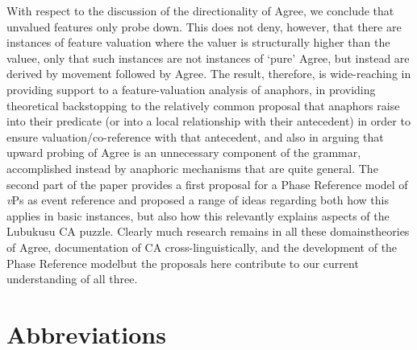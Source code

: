 \documentclass[output=paper
,modfonts
,nonflat
]{langsci/langscibook}
\begin{document}
With respect to the discussion of the directionality of Agree, we conclude that unvalued features only probe down.  This does not deny, however, that there are instances of feature valuation where the valuer is structurally higher than the valuee, only that such instances are not instances of `pure' Agree, but instead are derived by movement followed by Agree. The result, therefore, is wide-reaching in providing support to a feature-valuation analysis of anaphors, in providing theoretical backstopping to the relatively common proposal that anaphors raise into their predicate (or into a local relationship with their antecedent) in order to ensure valuation/co-reference with that antecedent, and also in arguing that upward probing of Agree is an unnecessary component of the grammar, accomplished instead by anaphoric mechanisms that are quite general. The second part of the paper provides a first proposal for a Phase Reference model of \textit{v}Ps as event reference and proposed a range of ideas regarding both how this applies in basic instances, but also how this relevantly explains aspects of the Lubukusu CA puzzle. Clearly much research remains in all these domains\textemdash theories of Agree, documentation of CA cross-linguistically, and the development of the Phase Reference model\textemdash but the proposals here contribute to our current understanding of all three. 

\section*{Abbreviations}
\end{document}
